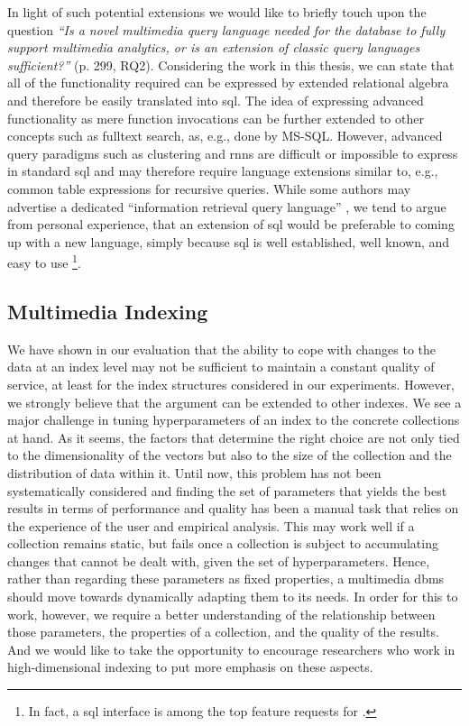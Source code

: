 In light of such potential extensions we would like to briefly touch upon the question  \emph{``Is a novel multimedia query language needed for the database to fully support multimedia analytics, or is an extension of classic query languages sufficient?''} \cite{Jonsson:2016Ten} (p. 299, RQ2). Considering the work in this thesis, we can state that all of the functionality required can be expressed by extended relational algebra and therefore be easily translated into \acrshort{sql}. The idea of expressing advanced functionality as mere function invocations can be further extended to other concepts such as fulltext search, as, e.g., done by MS-SQL. However, advanced query paradigms such as clustering and \acrshort{rnns} are difficult or impossible to express in standard \acrshort{sql} and may therefore require language extensions similar to, e.g., common table expressions for recursive queries. While some authors may advertise a dedicated ``information retrieval query language'' \cite{Ferro:2014Bridging}, we tend to argue from personal experience, that an extension of \acrshort{sql} would be preferable to coming up with a new language, simply because \acrshort{sql} is well established, well known, and easy to use \footnote{In fact, a \acrshort{sql} interface is among the top feature requests for \cottontail{}.}.

\subsection{Multimedia Indexing}

We have shown in our evaluation that the ability to cope with changes to the data at an index level may not be sufficient to maintain a constant quality of service, at least for the index structures considered in our experiments. However, we strongly believe that the argument can be extended to other indexes. We see a major challenge in tuning hyperparameters of an index to the concrete collections at hand. As it seems, the factors that determine the right choice are not only tied to the dimensionality of the vectors but also to the size of the collection and the distribution of data within it. Until now, this problem has not been systematically considered and finding the set of parameters that yields the best results in terms of performance and quality has been a manual task that relies on the experience of the user and empirical analysis. This may work well if a collection remains static, but fails once a collection is subject to accumulating changes that cannot be dealt with, given the set of hyperparameters. Hence, rather than regarding these parameters as fixed properties, a multimedia \acrshort{dbms} should move towards dynamically adapting them to its needs. In order for this to work, however, we require a better understanding of the relationship between those parameters, the properties of a collection, and the quality of the results. And we would like to take the opportunity to encourage researchers who work in high-dimensional indexing to put more emphasis on these aspects.

